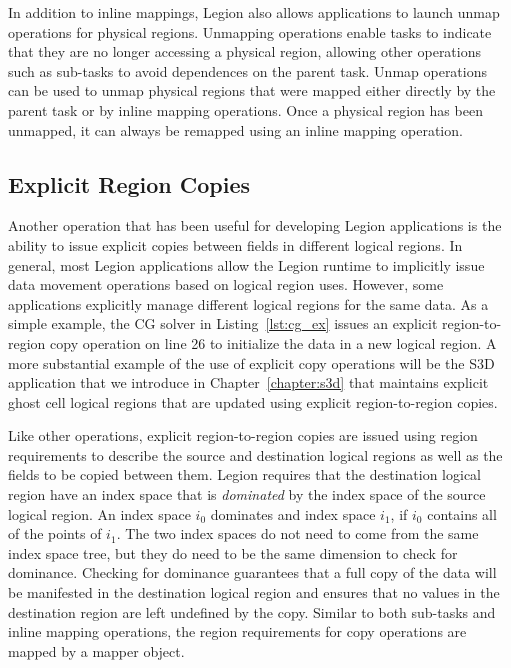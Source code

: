 In addition to inline mappings, Legion also allows
applications to launch unmap operations for 
physical regions. Unmapping operations enable 
tasks to indicate that they are no longer accessing
a physical region, allowing other operations
such as sub-tasks to avoid dependences on the
parent task. Unmap operations can be used to
unmap physical regions that were mapped either
directly by the parent task or by inline
mapping operations. Once a physical region
has been unmapped, it can always be remapped
using an inline mapping operation.

\subsection{Explicit Region Copies}
\label{subsec:copies}
Another operation that has been useful for
developing Legion applications is the
ability to issue explicit copies between fields
in different logical regions. In general, most
Legion applications allow the Legion runtime to
implicitly issue data movement operations based
on logical region uses.  However, some applications
explicitly manage different logical regions for
the same data. As a simple example, the CG solver
in Listing~\ref{lst:cg_ex} issues an explicit
region-to-region copy operation on line 26 to 
initialize the data in a new logical region.
A more substantial example of the use of explicit
copy operations will be the
S3D application that we introduce in 
Chapter~\ref{chapter:s3d} that maintains explicit
ghost cell logical regions that are updated
using explicit region-to-region copies.

Like other operations, explicit region-to-region
copies are issued using region requirements to
describe the source and destination logical regions
as well as the fields to be copied between them.
Legion requires that the
destination logical region have an index space
that is {\em dominated} by the index space of
the source logical region. An index space $i_0$
dominates and index space $i_1$, if $i_0$ contains
all of the points of $i_1$.
The two index spaces do not need to come from 
the same index space tree, but they do need to
be the same dimension to check for dominance.
Checking for dominance guarantees that a full 
copy of the data will be manifested in the 
destination logical region and ensures that no
values in the destination region are left
undefined by the copy. Similar to both 
sub-tasks and inline mapping operations, the
region requirements for copy operations are 
mapped by a mapper object.

